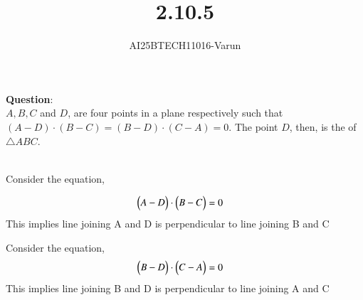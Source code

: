 \documentclass[journal]{IEEEtran}
\begin{document}

\vspace{3cm}

\title{2.10.5}
\author{AI25BTECH11016-Varun}
 \maketitle
{\let\newpage\relax\maketitle}
\renewcommand{\thefigure}{\theenumi}
\renewcommand{\thetable}{\theenumi}
\setlength{\intextsep}{10pt} %

\renewcommand{\thetable}{\theenumi}
\textbf{Question}:\\

$A, B, C$ and $D$, are four points in a plane respectively such that 
$(A - D) \cdot (B - C) = (B - D) \cdot (C - A) = 0.$  
The point $D$, then, is the \underline{\hspace{1cm}} of $\triangle ABC$. 

  
\solution \\
Consider the equation,

\begin{align}
\begin{pmatrix}A - D\end{pmatrix} \cdot \begin{pmatrix}B - C\end{pmatrix}
&=0
\end{align}
This implies line joining A and D is perpendicular to line joining B and C


Consider the equation,
\begin{align}
\begin{pmatrix}B - D\end{pmatrix} \cdot \begin{pmatrix}C - A\end{pmatrix}
&=0
\end{align}
This implies line joining B and D is perpendicular to line joining A and C
\end{document}
